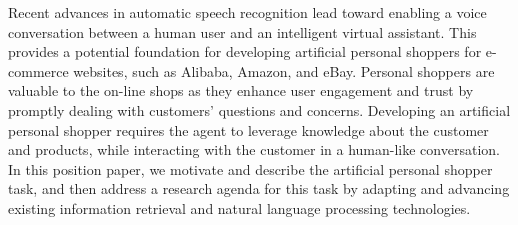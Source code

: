 Recent advances in automatic speech recognition lead toward enabling a voice conversation between a human user and an intelligent virtual assistant. This provides a potential foundation for developing artificial personal shoppers for e-commerce websites, such as Alibaba, Amazon, and eBay. Personal shoppers are valuable to the on-line shops as they enhance user engagement and trust by promptly dealing with customers' questions and concerns. Developing an artificial personal shopper  requires the agent to leverage knowledge about the customer and products, while interacting with the customer in a human-like conversation. In this position paper, we motivate and describe the artificial personal shopper task, and then address a research agenda for this task by adapting and advancing existing information retrieval and natural language processing technologies.
